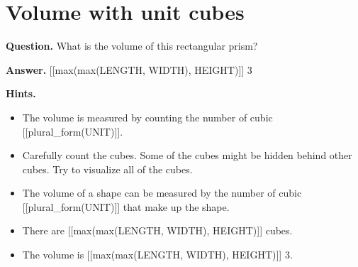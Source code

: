 \documentclass{article}
\begin{document}
\section*{Volume with unit cubes}
\textbf{Question.} What is the volume of this rectangular prism?

\textbf{Answer.} [[max(max(LENGTH, WIDTH), HEIGHT)]] 3

\textbf{Hints.}
\begin{itemize}
  \item The volume is measured by counting the number of cubic [[plural\_form(UNIT)]].
  \item Carefully count the cubes. Some of the cubes might be hidden behind other cubes. Try to visualize all of the cubes.
  \item The volume of a shape can be measured by the number of cubic [[plural\_form(UNIT)]] that make up the shape.
  \item There are [[max(max(LENGTH, WIDTH), HEIGHT)]] cubes.
  \item The volume is [[max(max(LENGTH, WIDTH), HEIGHT)]] 3.
\end{itemize}
\end{document}
